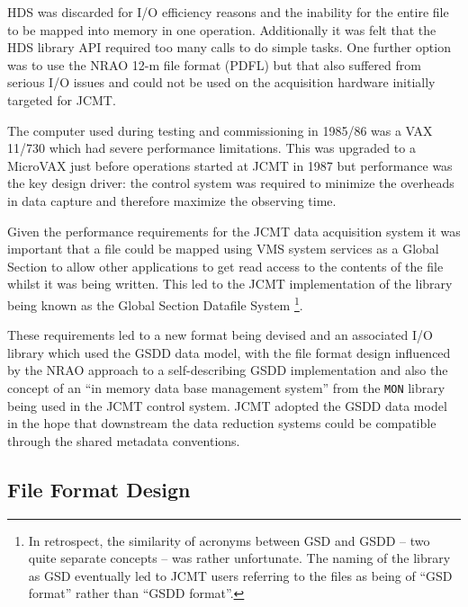 \documentclass[final,authoryear,5p,times,twocolumn]{elsarticle}
\begin{document}
HDS was discarded for I/O efficiency reasons and the inability for the
entire file to be mapped into memory in one operation. Additionally it
was felt that the HDS library API required too many calls to do simple
tasks. One further option was to use the NRAO 12-m file format (PDFL)
but that also suffered from serious I/O issues and could not be used
on the acquisition hardware initially targeted for JCMT.

The computer used during testing and commissioning in 1985/86 was a
VAX 11/730 which had severe performance limitations. This was upgraded
to a MicroVAX just before operations started at JCMT in 1987 but
performance was the key design driver: the control system was required
to minimize the overheads in data capture and therefore maximize the
observing time.

Given the performance requirements for the JCMT data acquisition
system it was important that a file could be mapped using VMS system
services as a Global Section to allow other applications to get read
access to the contents of the file whilst it was being written.  This
led to the JCMT implementation of the library being known as the
Global Section Datafile System \citep[GSD;][]{mtin33}\footnote{In retrospect,
the similarity of acronyms between GSD and GSDD -- two quite separate
concepts -- was rather unfortunate. The
  naming of the library as GSD eventually led to JCMT users referring
  to the files as being of ``GSD format'' rather than ``GSDD
  format''.}.

These requirements led to a new format being devised and an associated
I/O library which used the GSDD data model, with the file format design
influenced by the NRAO approach to a self-describing GSDD
implementation and also the concept of an ``in memory data base
management system'' from the \texttt{MON} library being used in the
JCMT control system.  JCMT adopted the GSDD data model in the hope
that downstream the data reduction systems could be compatible through
the shared metadata conventions.

\subsection{File Format Design}
\end{document}
